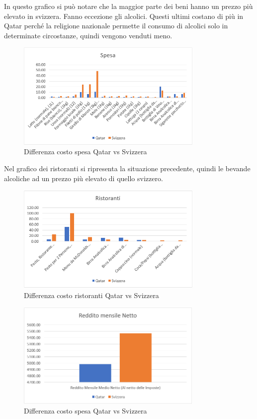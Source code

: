 \documentclass[a4paper, 12pt]{article}
\begin{document}
In questo grafico si può notare che la maggior parte dei beni hanno un prezzo più elevato in svizzera. Fanno eccezione gli alcolici. Questi ultimi costano di più in Qatar perché la religione nazionale permette il consumo di alcolici solo in determinate circostanze, quindi vengono venduti meno.

\begin{figure}[h]
    \centering
    \includegraphics[width=0.8\textwidth]{images/spesa.png}
    \caption{Differenza costo spesa Qatar vs Svizzera}
\end{figure}

Nel grafico dei ristoranti si ripresenta la situazione precedente, quindi le bevande alcoliche ad un prezzo più elevato di quello svizzero.

\begin{figure}[h]
    \centering
    \includegraphics[width=0.8\textwidth]{images/ristorante.png}
    \caption{Differenza costo ristoranti Qatar vs Svizzera}
\end{figure}

\pagebreak

\begin{figure}[h]
    \centering
    \includegraphics[width=0.8\textwidth]{images/reddito.png}
    \caption{Differenza costo spesa Qatar vs Svizzera}
\end{figure}
\end{document}

